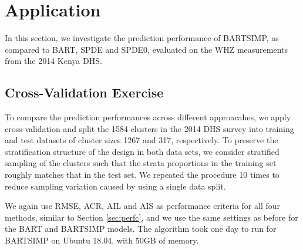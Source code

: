 \documentclass[preprint,12pt,authoryear]{elsarticle}
\begin{document}
{
\section{Application}
\label{sec:app}


In this section, we investigate the prediction performance of BARTSIMP, as compared to BART, SPDE and SPDE0, evaluated on the WHZ measurements from the 2014 Kenya DHS. 

\subsection{Cross-Validation Exercise}

To compare the prediction performances across different approacahes, we apply cross-validation and split the 1584 clusters in the 2014 DHS survey into training and test datasets of cluster sizes 1267 and 317, respectively. To preserve the stratification structure of the design in both data sets, we consider stratified sampling of the clusters such that the strata proportions in the training set roughly matches that in the test set. We repeated the procedure 10 times to reduce sampling variation caused by using a single data split. {We again use RMSE, ACR, AIL and AIS as performance criteria for all four methods, similar to Section \ref{sec:perfc}, and we use the same settings as before for the BART and BARTSIMP models. The algorithm took one day to run for BARTSIMP on Ubuntu 18.04, with 50GB of memory.

}}
\end{document}
